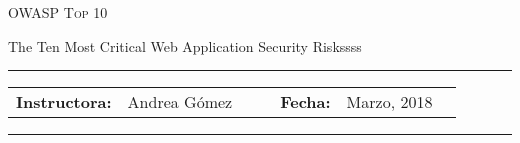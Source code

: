 \documentclass[12pt, letter-paper]{article}
\begin{document}
\begin{center}
  {\Large \textsc{OWASP Top 10}}
\end{center}
\begin{center}
  The Ten Most Critical Web Application Security Riskssss
\end{center}

\begin{center}
  \rule{6in}{0.4pt}
  \begin{minipage}[t]{.75\textwidth}
    \begin{tabular}{llcccll}
      \textbf{Instructora:} & Andrea Gómez & & &
      \textbf{Fecha:} & Marzo, 2018
    \end{tabular}
  \end{minipage}
  \rule{6in}{0.4pt}
\end{center}
\vspace{.5cm}
\setlength{\unitlength}{1in}
\renewcommand{\arraystretch}{2}
\end{document}
